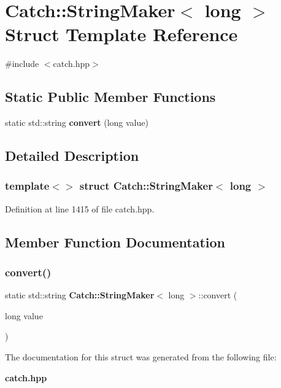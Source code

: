\section{Catch\+::String\+Maker$<$ long $>$ Struct Template Reference}
\label{struct_catch_1_1_string_maker_3_01long_01_4}


{\ttfamily \#include $<$catch.\+hpp$>$}

\subsection*{Static Public Member Functions}
\begin{DoxyCompactItemize}
\item 
static std\+::string \textbf{ convert} (long value)
\end{DoxyCompactItemize}


\subsection{Detailed Description}
\subsubsection*{template$<$$>$\newline
struct Catch\+::\+String\+Maker$<$ long $>$}



Definition at line 1415 of file catch.\+hpp.



\subsection{Member Function Documentation}
\mbox{\label{struct_catch_1_1_string_maker_3_01long_01_4_a1c0c56497813e7a6425c5411d5e66447}} 
\subsubsection{convert()}
{\footnotesize\ttfamily static std\+::string \textbf{ Catch\+::\+String\+Maker}$<$ long $>$\+::convert (\begin{DoxyParamCaption}\item[{long}]{value }\end{DoxyParamCaption})\hspace{0.3cm}{\ttfamily [static]}}



The documentation for this struct was generated from the following file\+:\begin{DoxyCompactItemize}
\item 
\textbf{ catch.\+hpp}\end{DoxyCompactItemize}
